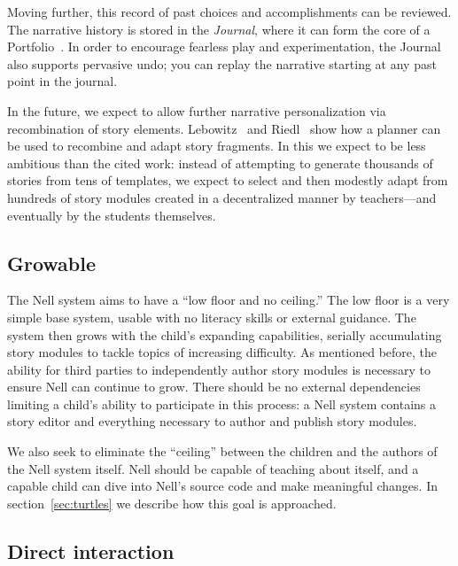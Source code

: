 \documentclass{acm_proc_article-sp}
\begin{document}
Moving further, this record of past choices and accomplishments can be
reviewed.  The narrative history is stored in the \textit{Journal},
where it can form the core of a Portfolio~\cite{stefanakis:portfolios}.
In order to encourage fearless play and experimentation, the Journal
also supports pervasive undo; you can replay the narrative starting at
any past point in the journal.

In the future, we expect to allow further narrative personalization
via recombination of story elements.
Lebowitz~\cite{lebowitz:universe85} and Riedl~\cite{riedl:planning}
show how a planner can be used to recombine and adapt story fragments.
In this we expect to be less ambitious than the cited work: instead of
attempting to generate thousands of stories from tens of templates, we
expect to select and then modestly adapt from hundreds of story
modules created in a decentralized manner by teachers---and eventually
by the students themselves.

\subsection{Growable}
The Nell system aims to have a ``low floor and no ceiling.''  The low
floor is a very simple base system, usable with no literacy skills or
external guidance.  The system then grows with the child's expanding
capabilities, serially accumulating story modules to tackle topics of
increasing difficulty.  As mentioned before, the ability for third
parties to independently author story modules is necessary to ensure
Nell can continue to grow.  There should be no external dependencies
limiting a child's ability to participate in this process: a Nell
system contains a story editor and everything necessary to
author and publish story modules.

We also seek to eliminate the ``ceiling'' between the children and
the authors of the Nell system itself.  Nell should be capable of
teaching about itself, and a capable child can dive into Nell's source
code and make meaningful changes.  In section~\ref{sec:turtles} we
describe how this goal is approached.


\subsection{Direct interaction}
\end{document}
